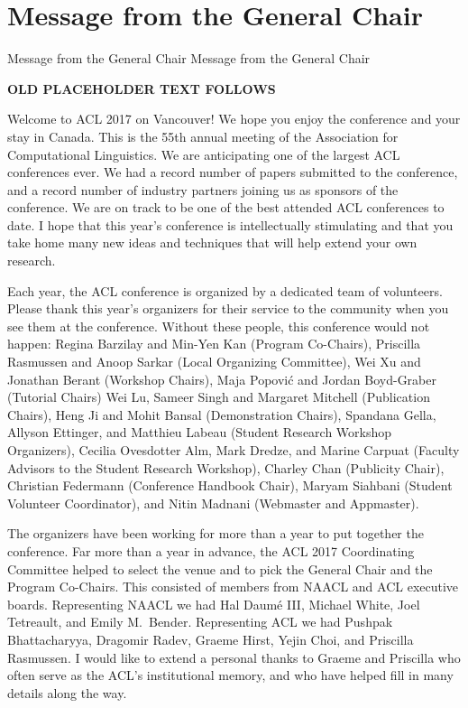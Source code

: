 \vspace{2em}

\section{Message from the General Chair}\vspace{2em}
\setheaders%
    {Message from the General Chair}%
    {Message from the General Chair}
\thispagestyle{emptyheader}

\setlength{\parskip}{1ex}

\textbf{OLD PLACEHOLDER TEXT FOLLOWS}

Welcome to ACL 2017 on Vancouver!  We hope you enjoy the conference and your
stay in Canada.    This is the 55th annual meeting of the Association for Computational Linguistics.  We are anticipating one of the largest ACL conferences ever.  We had a record number of papers submitted to the conference, and a record number of industry partners joining us as sponsors of the conference.   We are on track to be one of the best attended ACL conferences to date.   I hope that this year's conference is intellectually stimulating and that you take home many new ideas and techniques that will help extend your own research.

Each year, the ACL conference is organized by a dedicated team of volunteers.  Please thank this year's organizers for their service to the community when you see them at the conference.  Without these people, this conference would not happen:  Regina Barzilay and Min-Yen Kan (Program Co-Chairs),
Priscilla Rasmussen and Anoop Sarkar (Local Organizing Committee),
Wei Xu and  Jonathan Berant (Workshop Chairs),
Maja Popovi\'c and Jordan Boyd-Graber (Tutorial Chairs)
Wei Lu, Sameer Singh and Margaret Mitchell (Publication Chairs),
Heng Ji and Mohit Bansal (Demonstration Chairs),
Spandana Gella, Allyson Ettinger, and Matthieu Labeau (Student Research Workshop Organizers),
Cecilia Ovesdotter Alm, Mark Dredze, and Marine Carpuat (Faculty Advisors to the Student Research Workshop),
Charley Chan  (Publicity Chair),
Christian Federmann (Conference Handbook Chair), 
Maryam Siahbani (Student Volunteer Coordinator), 
and 
Nitin Madnani (Webmaster and Appmaster).

The organizers have been working for more than a year to put together the conference.  Far more than a year in advance, the  ACL 2017 Coordinating Committee helped to select the venue and to pick the General Chair and the Program Co-Chairs.  This consisted of members from  NAACL and ACL executive boards. Representing NAACL we had Hal Daum\'e III,  Michael White, Joel Tetreault,  and Emily M.\ Bender.  Representing ACL we had  Pushpak Bhattacharyya, Dragomir Radev,   Graeme Hirst, Yejin Choi, and Priscilla Rasmussen.  I would like to extend a personal thanks to Graeme and Priscilla who often serve as the ACL’s institutional memory, and who have helped fill in many details along the way.

